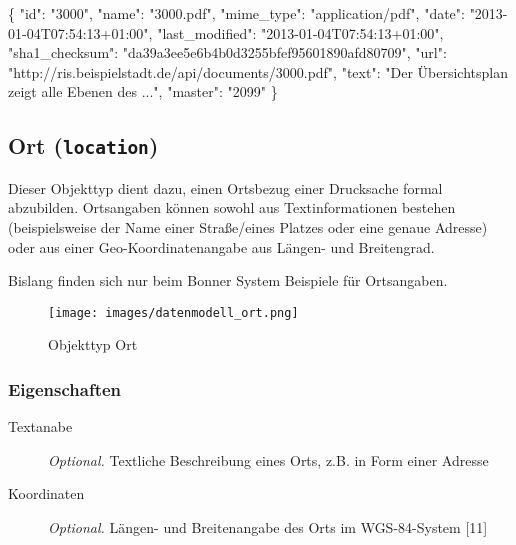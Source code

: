 \documentclass[,a4paper]{article}
\makeatletter
\newenvironment{Shaded}{}{}
\newcommand{\DataTypeTok}[1]{\textcolor[rgb]{0.56,0.13,0.00}{{#1}}}
\newcommand{\StringTok}[1]{\textcolor[rgb]{0.25,0.44,0.63}{{#1}}}
\newcommand{\NormalTok}[1]{{#1}}
\def\maxwidth{\ifdim\Gin@nat@width>\linewidth\linewidth
\else\Gin@nat@width\fi}
\let\Oldincludegraphics\includegraphics
\renewcommand{\includegraphics}[1]{\Oldincludegraphics[width=\maxwidth]{#1}}
\makeatother
\begin{document}
\begin{Shaded}
\begin{Highlighting}[]
\NormalTok{\{}
    \DataTypeTok{"id"}\NormalTok{: }\StringTok{"3000"}\NormalTok{,}
    \DataTypeTok{"name"}\NormalTok{: }\StringTok{"3000.pdf"}\NormalTok{,}
    \DataTypeTok{"mime_type"}\NormalTok{: }\StringTok{"application/pdf"}\NormalTok{,}
    \DataTypeTok{"date"}\NormalTok{: }\StringTok{"2013-01-04T07:54:13+01:00"}\NormalTok{,}
    \DataTypeTok{"last_modified"}\NormalTok{: }\StringTok{"2013-01-04T07:54:13+01:00"}\NormalTok{,}
    \DataTypeTok{"sha1_checksum"}\NormalTok{: }\StringTok{"da39a3ee5e6b4b0d3255bfef95601890afd80709"}\NormalTok{,}
    \DataTypeTok{"url"}\NormalTok{: }\StringTok{"http://ris.beispielstadt.de/api/documents/3000.pdf"}\NormalTok{,}
    \DataTypeTok{"text"}\NormalTok{: }\StringTok{"Der Übersichtsplan zeigt alle Ebenen des ..."}\NormalTok{,}
    \DataTypeTok{"master"}\NormalTok{: }\StringTok{"2099"}
\NormalTok{\}}
\end{Highlighting}
\end{Shaded}

\subsection{Ort (\texttt{location})}

Dieser Objekttyp dient dazu, einen Ortsbezug einer Drucksache formal
abzubilden. Ortsangaben können sowohl aus Textinformationen bestehen
(beispielsweise der Name einer Straße/eines Platzes oder eine genaue
Adresse) oder aus einer Geo-Koordinatenangabe aus Längen- und
Breitengrad.

Bislang finden sich nur beim Bonner System Beispiele für Ortsangaben.

\begin{figure}[htbp]
\centering
\texttt{[image: images/datenmodell\_ort.png]}
\caption{Objekttyp Ort}
\end{figure}

\subsubsection{Eigenschaften}

\begin{description}
\item[Textanabe]
\emph{Optional.} Textliche Beschreibung eines Orts, z.B. in Form einer
Adresse
\item[Koordinaten]
\emph{Optional.} Längen- und Breitenangabe des Orts im WGS-84-System
{[}11{]}
\end{description}
\end{document}
